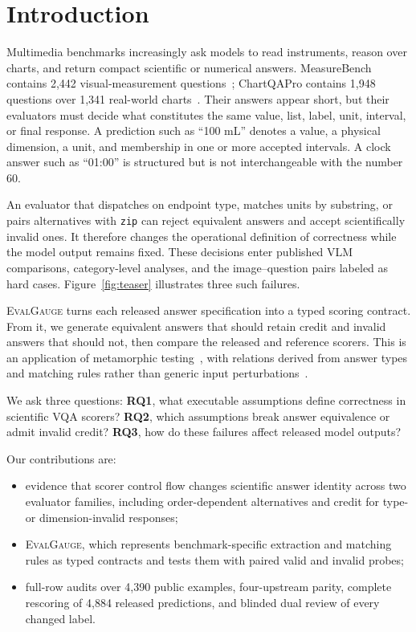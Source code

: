 \documentclass[a4paper]{llncs}
\newcommand{\tool}{\textsc{EvalGauge}}
\begin{document}
\section{Introduction}
Multimedia benchmarks increasingly ask models to read instruments, reason over charts, and return compact scientific or numerical answers. MeasureBench contains 2,442 vis\-ual-measurement questions~\cite{lin2026measurebench}; ChartQAPro contains 1,948 questions over 1,341 real-world charts~\cite{masry2025chartqapro}. Their answers appear short, but their evaluators must decide what constitutes the same value, list, label, unit, interval, or final response. A prediction such as ``100 mL'' denotes a value, a physical dimension, a unit, and membership in one or more accepted intervals. A clock answer such as ``01:00'' is structured but is not interchangeable with the number 60.

An evaluator that dispatches on endpoint type, matches units by substring, or pairs alternatives with \texttt{zip} can reject equivalent answers and accept scientifically invalid ones. It therefore changes the operational definition of correctness while the model output remains fixed. These decisions enter published VLM comparisons, category-level analyses, and the image--question pairs labeled as hard cases. Figure~\ref{fig:teaser} illustrates three such failures.

\tool{} turns each released answer specification into a typed scoring contract. From it, we generate equivalent answers that should retain credit and invalid answers that should not, then compare the released and reference scorers. This is an application of metamorphic testing~\cite{segura2016survey}, with relations derived from answer types and matching rules rather than generic input perturbations~\cite{ribeiro2020checklist}.

We ask three questions: \textbf{RQ1}, what executable assumptions define correctness in scientific VQA scorers? \textbf{RQ2}, which assumptions break answer equivalence or admit invalid credit? \textbf{RQ3}, how do these failures affect released model outputs?

Our contributions are:
\begin{itemize}
  \item evidence that scorer control flow changes scientific answer identity across two evaluator families, including order-dependent alternatives and credit for type- or dimen\-sion-invalid responses;
  \item \tool{}, which represents benchmark-specific extraction and matching rules as typed contracts and tests them with paired valid and invalid probes;
  \item full-row audits over 4,390 public examples, four-upstream parity, complete rescoring of 4,884 released predictions, and blinded dual review of every changed label.
\end{itemize}
\end{document}
